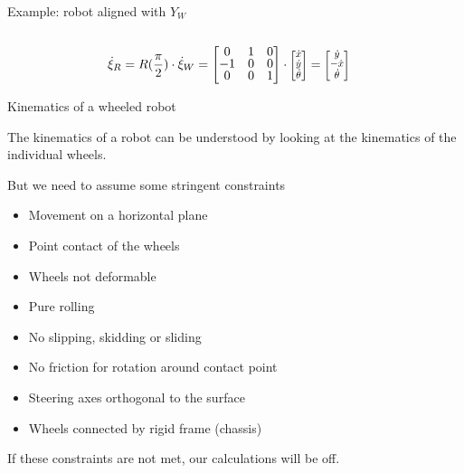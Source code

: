 \documentclass[compress]{beamer}
\newcommand{\colvec}[2][.8]{%
  \scalebox{#1}{%
    \renewcommand{\arraystretch}{.8}%
    $\begin{bmatrix}#2\end{bmatrix}$%
  }
}
\begin{document}
\begin{frame}{Example: robot aligned with $Y_W$}
\begin{columns}
\begin{column}{0.4\linewidth}
{
            }

        \end{column}
    \end{columns}


    \begin{align*}
        \dot\xi_R &= R(\frac{\pi}{2})\cdot \dot\xi_W = \begin{bmatrix} 0 & 1 & 0 \\
                                                                      -1 & 0 & 0 \\
                                                                       0 & 0 & 1 \end{bmatrix} \cdot \colvec{\dot{x} \\ \dot{y} \\ \dot\theta} =  \colvec{\dot{y} \\ -\dot{x} \\ \dot\theta} 
    \end{align*}



\end{frame}

\begin{frame}{Kinematics of a wheeled robot}

The kinematics of a robot can be understood by looking at the kinematics
of the individual wheels.

But we need to assume some stringent constraints

\begin{itemize}
    \item Movement on a horizontal plane
    \item Point contact of the wheels
    \item Wheels not deformable
    \item Pure rolling
    \item No slipping, skidding or sliding
    \item No friction for rotation around contact point
    \item Steering axes orthogonal to the surface
    \item Wheels connected by rigid frame (chassis)
\end{itemize}

If these constraints are not met, our calculations will be off.

\end{frame}
\end{document}
